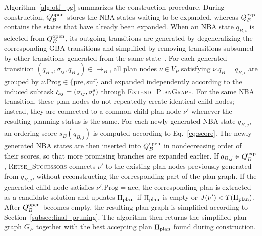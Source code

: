 \documentclass[lettersize,journal]{IEEEtran}
\theoremstyle{italiclemma}
\theoremstyle{italiclemma}
\theoremstyle{definition}
\begin{document}
Algorithm~\ref{alg:otf_pg} summarizes the  construction procedure. During construction, $Q_B^{\rm open}$ stores the NBA states waiting to be expanded, whereas $Q_B^{\rm exp}$ contains the states that have already been expanded. When an NBA state $q_{B,i}$ is selected from $Q_B^{\rm open}$, its outgoing transitions are generated by degeneralizing the corresponding GBA transitions and simplified by removing transitions subsumed by other transitions generated from the same state~\cite{Gastin2001FastLT}.
For each generated transition
$(q_{B,i},\sigma_{ij},q_{B,j})\in\rightarrow_B$,
all plan nodes $\nu\in V_P$ satisfying $\nu.q_B=q_{B,i}$ are grouped by $\nu.\mathrm{Prog}\in\{\mathrm{pre},\mathrm{suf}\}$ and expanded independently according to the induced subtask $\xi_{ij}=(\sigma_{ij},\sigma_i^{\rm s})$ through \textsc{Extend\_PlanGraph}. For the same NBA transition, these plan nodes do not repeatedly create identical child nodes; instead, they are connected to a common child plan node $\nu'$ whenever the resulting planning status is the same.  For each newly generated NBA state $q_{B,j}$, an ordering score
$s_B(q_{B,j})$ is computed according to Eq.~\eqref{eq:score}. The newly generated NBA states are then inserted into $Q_B^{\rm open}$ in nondecreasing order of their scores, so that more promising branches are expanded earlier.  If $q_{B,j}\in Q_B^{\rm exp}$,  \textsc{Reuse\_Successors} connects $\nu'$ to the existing plan nodes previously generated from $q_{B,j}$, without reconstructing the corresponding part of the plan graph.
If the generated child node satisfies $\nu'.\mathrm{Prog}=\mathrm{acc}$, the corresponding plan is extracted as
a candidate solution and updates $\Pi_{\rm plan}$ if $\Pi_{\rm plan}$ is empty or $J(\nu')<T(\Pi_{\rm plan})$.  After $Q_B^{\rm open}$ becomes empty, the resulting plan graph is simplified according to Section~\ref{subsec:final_pruning}. The algorithm then returns
the simplified plan graph $G_P^{-}$ together with the best accepting plan $\Pi_{\rm plan}$ found during construction.

\end{document}
